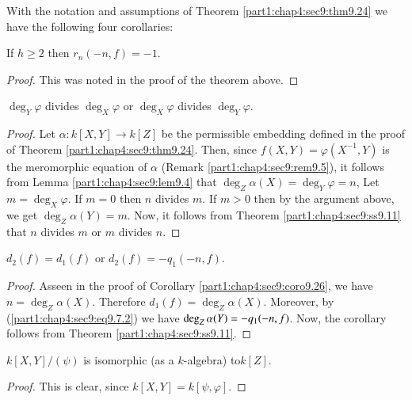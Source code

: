 With the notation and assumptions of Theorem \ref{part1:chap4:sec9:thm9.24} we have the following four corollaries:
\begin{coro}\label{part1:chap4:sec9:coro9.25}
  If $h \geq 2$ then $r_n (-n, f)=- 1$.
\end{coro}

\begin{proof}
  This was noted in the proof of the theorem above.
\end{proof}

\begin{coro}\label{part1:chap4:sec9:coro9.26}
  $\deg_Y \varphi$ divides $\deg_X \varphi$ or $\deg_X \varphi$ divides $\deg_Y \varphi$. 
\end{coro}

\begin{proof}
  Let $\alpha: k [X, Y] \to k [Z]$ be the permissible embedding defined in the proof of Theorem \ref{part1:chap4:sec9:thm9.24}. Then, since $f(X, Y)= \varphi(X^{-1}, Y)$ is the meromorphic equation of $\alpha$ (Remark \ref{part1:chap4:sec9:rem9.5}), it follows from Lemma \ref{part1:chap4:sec9:lem9.4} that $\deg_Z \alpha (X)= \deg_Y \varphi =n$, Let $m = \deg_X \varphi$. If $m=0$ then $n$ divides $m$. If $m > 0$ then by the argument above, we get $\deg_Z \alpha(Y)=m$. Now, it follows from Theorem \ref{part1:chap4:sec9:ss9.11} that $n$ divides $m$ or $m$ divides $n$. 
\end{proof}

\begin{coro}\label{part1:chap4:sec9:coro9.27}
  $d_2 (f) = d_1 (f)$ or $d_2 (f)=- q_1(-n, f)$.
\end{coro}

\begin{proof}
  As\pageoriginale seen in the proof of Corollary
  \ref{part1:chap4:sec9:coro9.26}, we have $n= \deg_Z
  \alpha(X)$. Therefore $d_1 (f)= \deg_Z \alpha (X)$. Moreover, by
  (\ref{part1:chap4:sec9:eq9.7.2}) we have $\deg_Z\break \alpha (Y)= - q_1
  (-n, f)$. Now, the corollary follows from Theorem
  \ref{part1:chap4:sec9:ss9.11}. 
\end{proof}

\begin{coro}\label{part1:chap4:sec9:coro9.28}
  $k[X, Y]/(\psi)$ is isomorphic (as a $k$-algebra) to\break $k[Z]$. 
\end{coro}

\begin{proof}
  This is clear, since $k[X, Y]= k [\psi, \varphi]$.
\end{proof}

